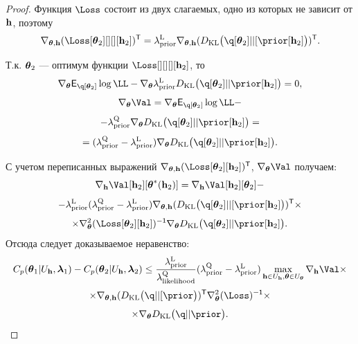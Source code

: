 \begin{proof}
Функция $\Loss$ состоит из двух слагаемых, одно из которых не зависит от $\mathbf{h}$, поэтому
\[
    \nabla_{\teta, \h} (\Loss[\teta_2][][][\h_2])^\mathsf{T}  = \lamCL \nabla_{\teta, \h} (\KL{\q[\teta_2]}{[\prior[\h_2]})^\mathsf{T}.
\]

Т.к. $\boldsymbol{\theta}_2$ --- оптимум функции $\Loss[][][][\h_2]$, то 
$$ 
\nabla_{\teta} \E_{\q[\teta_2]} \log \LL - \nabla_{\teta} \lamCL \KL{\q[\teta_2]}{\prior[\h_2]} = 0,
$$
$$ 
\nabla_{\teta} \Val =\nabla_{\teta} \E_{\q[\teta_2]} \log \LL -
$$
\[
- \lamCQ  \nabla_{\teta} \KL{\q[\teta_2]}{\prior[\h_2]} = 
\]
$$
   = (\lamCQ - \lamCL)\nabla_{\teta} \KL{\q[\teta_2]}{\prior[\h_2]}.
$$

С учетом переписанных выражений $\nabla_{\teta, \h} (\Loss[\teta_2][\h_2])^\mathsf{T}$, $\nabla_{\teta} \Val$ получаем:
\[
     \nabla_{\h} \Val[\h_2][\teta^{*}(\h_2)]  = \nabla_{\h} \Val[\h_2][\teta_2] -
\]
\[
    -  \lamCL (\lamCQ - \lamCL)\nabla_{\teta, \h} (\KL{\q[\teta_2]}{[\prior[\h_2]})^\mathsf{T}  \times 
\]
\[
\times  \nabla_{\teta}^2(\Loss[\teta_2][\h_2])^\mathsf{-1} \nabla_{\teta} \KL{\q[\teta_2]}{\prior[\h_2]}.
\]
Отсюда следует доказываемое неравенство:
\[
    C_p(\teta_1|\Uh, \lam_1) - C_p(\teta_2|\Uh, \lam_2)  \leq \frac{\lamCL }{\lamLL} (\lamCQ - \lamCL) \max_{\h \in \Uh, \teta \in \Uteta}  \nabla_{\h} \Val  \times
\]
\[
 \times \nabla_{\teta, \h} (\KL{\q}{[\prior})^\mathsf{T}  \nabla_{\teta}^2(\Loss)^\mathsf{-1} \times
\]
\[\times \nabla_{\teta} \KL{\q}{\prior}.
\]

\end{proof}


